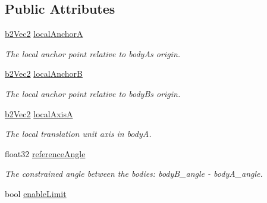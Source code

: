 \subsection*{Public Attributes}
\begin{DoxyCompactItemize}
\item 
\hyperlink{structb2_vec2}{b2\+Vec2} \hyperlink{structb2_prismatic_joint_def_abb51df8daff7a55f47adc83e4f7fa5b9}{local\+AnchorA}\hypertarget{structb2_prismatic_joint_def_abb51df8daff7a55f47adc83e4f7fa5b9}{}\label{structb2_prismatic_joint_def_abb51df8daff7a55f47adc83e4f7fa5b9}

\begin{DoxyCompactList}\small\item\em The local anchor point relative to bodyA\textquotesingle{}s origin. \end{DoxyCompactList}\item 
\hyperlink{structb2_vec2}{b2\+Vec2} \hyperlink{structb2_prismatic_joint_def_a5acc1f2f14d1b659fc9d804ab1baf4a3}{local\+AnchorB}\hypertarget{structb2_prismatic_joint_def_a5acc1f2f14d1b659fc9d804ab1baf4a3}{}\label{structb2_prismatic_joint_def_a5acc1f2f14d1b659fc9d804ab1baf4a3}

\begin{DoxyCompactList}\small\item\em The local anchor point relative to bodyB\textquotesingle{}s origin. \end{DoxyCompactList}\item 
\hyperlink{structb2_vec2}{b2\+Vec2} \hyperlink{structb2_prismatic_joint_def_af36fdbcedca5a392a2649cd235c42676}{local\+AxisA}\hypertarget{structb2_prismatic_joint_def_af36fdbcedca5a392a2649cd235c42676}{}\label{structb2_prismatic_joint_def_af36fdbcedca5a392a2649cd235c42676}

\begin{DoxyCompactList}\small\item\em The local translation unit axis in bodyA. \end{DoxyCompactList}\item 
float32 \hyperlink{structb2_prismatic_joint_def_aa84b43d08e6e11b4daa0c86f46094463}{reference\+Angle}\hypertarget{structb2_prismatic_joint_def_aa84b43d08e6e11b4daa0c86f46094463}{}\label{structb2_prismatic_joint_def_aa84b43d08e6e11b4daa0c86f46094463}

\begin{DoxyCompactList}\small\item\em The constrained angle between the bodies\+: body\+B\+\_\+angle -\/ body\+A\+\_\+angle. \end{DoxyCompactList}\item 
bool \hyperlink{structb2_prismatic_joint_def_aa61a03b68caac62a5cf66354f6756eae}{enable\+Limit}\hypertarget{structb2_prismatic_joint_def_aa61a03b68caac62a5cf66354f6756eae}{}\label{structb2_prismatic_joint_def_aa61a03b68caac62a5cf66354f6756eae}


\end{DoxyCompactItemize}
